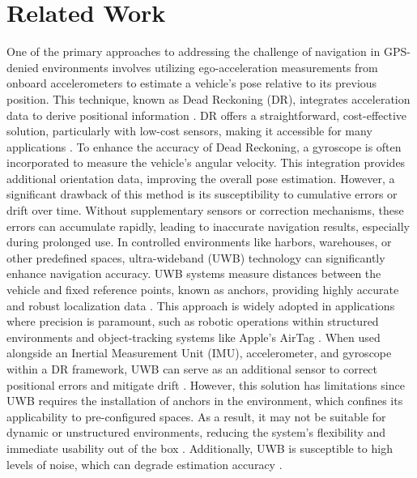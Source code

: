 \section{Related Work}
One of the primary approaches to addressing the challenge of navigation
in GPS-denied environments involves utilizing ego-acceleration measurements
from onboard accelerometers to estimate a vehicle's pose relative
to its previous position. This technique, known as Dead Reckoning
(DR), integrates acceleration data to derive positional information
\cite{hash2025_RIENG_Avionics}. DR offers a straightforward, cost-effective
solution, particularly with low-cost sensors, making it accessible
for many applications \cite{Hou9162069Pedestrian}. To enhance the
accuracy of Dead Reckoning, a gyroscope is often incorporated to measure
the vehicle's angular velocity. This integration provides additional
orientation data, improving the overall pose estimation. However,
a significant drawback of this method is its susceptibility to cumulative
errors or drift over time. Without supplementary sensors or correction
mechanisms, these errors can accumulate rapidly, leading to inaccurate
navigation results, especially during prolonged use. In controlled
environments like harbors, warehouses, or other predefined spaces,
ultra-wideband (UWB) technology can significantly enhance navigation
accuracy. UWB systems measure distances between the vehicle and fixed
reference points, known as anchors, providing highly accurate and
robust localization data \cite{Hashim2023NonlinearFusion}. This approach
is widely adopted in applications where precision is paramount, such
as robotic operations within structured environments and object-tracking
systems like Apple's AirTag \cite{Roth2022AirTag}. When used alongside
an Inertial Measurement Unit (IMU), accelerometer, and gyroscope within
a DR framework, UWB can serve as an additional sensor to correct positional
errors and mitigate drift \cite{Hashim2023NonlinearFusion}. However,
this solution has limitations since UWB requires the installation
of anchors in the environment, which confines its applicability to
pre-configured spaces. As a result, it may not be suitable for dynamic
or unstructured environments, reducing the system's flexibility and
immediate usability out of the box \cite{hashim2023exponentially}.
Additionally, UWB is susceptible to high levels of noise, which can
degrade estimation accuracy \cite{Hashim2023NonlinearFusion}.

